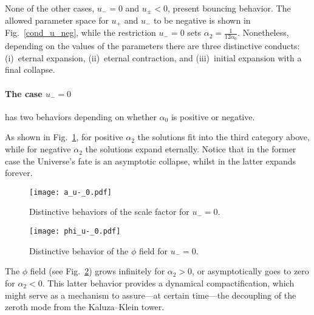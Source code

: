 \documentclass[aps,prd,12pt,superscriptaddress,showpacs,showkeys,longbibliography,reprint,nofootinbib]{revtex4-1}
\begin{document}
None of the other cases, $u_- = 0$ and $u_\pm < 0$, present bouncing behavior.
The allowed parameter space for $u_+$ and $u_-$ to be negative is shown in Fig.~\ref{cond_u_neg}, while the restriction $u_- = 0$ sets $\alpha_2 = \tfrac{1}{12 \alpha_0}$.
Nonetheless, depending on the values of the parameters there are three distinctive conducts: (i)~eternal expansion, (ii)~eternal contraction, and (iii)~initial expansion with a final collapse.

\paragraph{The case $u_- = 0$} has two behaviors depending on whether $\alpha_0$ is positive or negative.

As shown in Fig.~\ref{a_u_0}, for positive $\alpha_2$ the solutions fit into the third category above, while for negative $\alpha_2$ the solutions expand eternally. Notice that in the former case the Universe's fate is an asymptotic collapse, whilst in the latter expands forever.
\begin{figure}[H]
  \texttt{[image: a\_u-\_0.pdf]} 
  \caption{Distinctive behaviors of the scale factor for $u_- = 0$.}
  \label{a_u_0}
\end{figure}
\begin{figure}[H]
  \texttt{[image: phi\_u-\_0.pdf]}
  \caption{Distinctive behavior of the $\phi$ field for $u_- = 0$.}
  \label{phi_u_0}
\end{figure}
The $\phi$ field (see Fig.~\ref{phi_u_0}) grows infinitely for $\alpha_2 > 0$, or asymptotically goes to zero for $\alpha_2 < 0$. This latter behavior provides a {dynamical} compactification, which might serve as a mechanism to assure---at certain time---the decoupling of the zeroth mode from the Kaluza--Klein tower.
\end{document}
